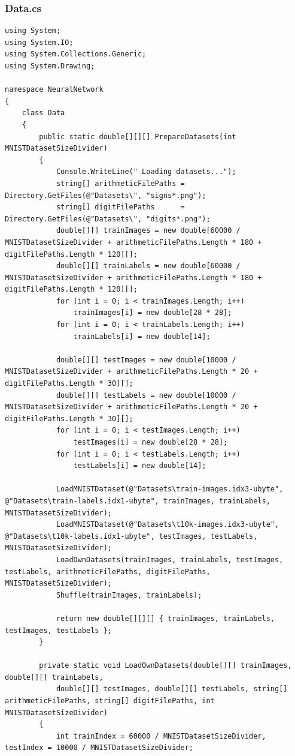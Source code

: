 \documentclass[12pt,a4paper]{article}
\begin{document}
	\subsubsection*{Data.cs}
	\begin{lstlisting}
using System;
using System.IO;
using System.Collections.Generic;
using System.Drawing;

namespace NeuralNetwork
{
    class Data
    {
        public static double[][][] PrepareDatasets(int MNISTDatasetSizeDivider)
        {
            Console.WriteLine(" Loading datasets...");
            string[] arithmeticFilePaths = Directory.GetFiles(@"Datasets\", "signs*.png");
            string[] digitFilePaths      = Directory.GetFiles(@"Datasets\", "digits*.png");
            double[][] trainImages = new double[60000 / MNISTDatasetSizeDivider + arithmeticFilePaths.Length * 180 + digitFilePaths.Length * 120][];
            double[][] trainLabels = new double[60000 / MNISTDatasetSizeDivider + arithmeticFilePaths.Length * 180 + digitFilePaths.Length * 120][];
            for (int i = 0; i < trainImages.Length; i++)
                trainImages[i] = new double[28 * 28];
            for (int i = 0; i < trainLabels.Length; i++)
                trainLabels[i] = new double[14];

            double[][] testImages = new double[10000 / MNISTDatasetSizeDivider + arithmeticFilePaths.Length * 20 + digitFilePaths.Length * 30][];
            double[][] testLabels = new double[10000 / MNISTDatasetSizeDivider + arithmeticFilePaths.Length * 20 + digitFilePaths.Length * 30][];
            for (int i = 0; i < testImages.Length; i++)
                testImages[i] = new double[28 * 28];
            for (int i = 0; i < testLabels.Length; i++)
                testLabels[i] = new double[14];

            LoadMNISTDataset(@"Datasets\train-images.idx3-ubyte", @"Datasets\train-labels.idx1-ubyte", trainImages, trainLabels, MNISTDatasetSizeDivider);
            LoadMNISTDataset(@"Datasets\t10k-images.idx3-ubyte", @"Datasets\t10k-labels.idx1-ubyte", testImages, testLabels, MNISTDatasetSizeDivider);
            LoadOwnDatasets(trainImages, trainLabels, testImages, testLabels, arithmeticFilePaths, digitFilePaths, MNISTDatasetSizeDivider);
            Shuffle(trainImages, trainLabels);

            return new double[][][] { trainImages, trainLabels, testImages, testLabels };
        }

        private static void LoadOwnDatasets(double[][] trainImages, double[][] trainLabels, 
            double[][] testImages, double[][] testLabels, string[] arithmeticFilePaths, string[] digitFilePaths, int MNISTDatasetSizeDivider)
        {
            int trainIndex = 60000 / MNISTDatasetSizeDivider, testIndex = 10000 / MNISTDatasetSizeDivider;


\end{lstlisting}
\end{document}
